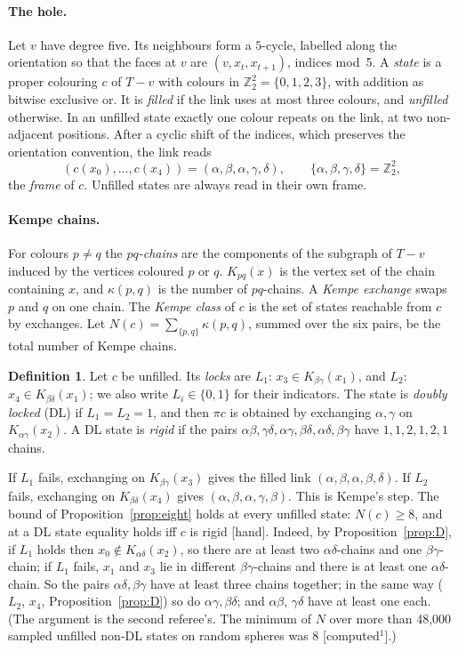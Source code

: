 \documentclass[11pt]{article}
\theoremstyle{definition}
\newtheorem{definition}[theorem]{Definition}
\newcommand{\lab}[1]{\textsf{[#1]}}
\newcommand{\labone}{\textsf{[computed$^1$]}}
\newcommand{\Z}{\mathbb Z}
\begin{document}
\paragraph{The hole.} Let $v$ have degree five. Its neighbours form a $5$-cycle, labelled along the orientation so that the faces at $v$ are $(v,x_t,x_{t+1})$, indices mod~5. A \emph{state} is a proper colouring $c$ of $T-v$ with colours in $\Z_2^2=\{0,1,2,3\}$, with addition as bitwise exclusive or. It is \emph{filled} if the link uses at most three colours, and \emph{unfilled} otherwise. In an unfilled state exactly one colour repeats on the link, at two non-adjacent positions. After a cyclic shift of the indices, which preserves the orientation convention, the link reads
\[(c(x_0),\dots,c(x_4))=(\alpha,\beta,\alpha,\gamma,\delta),\qquad\{\alpha,\beta,\gamma,\delta\}=\Z_2^2,\]
the \emph{frame} of $c$. Unfilled states are always read in their own frame.

\paragraph{Kempe chains.} For colours $p\ne q$ the \emph{$pq$-chains} are the components of the subgraph of $T-v$ induced by the vertices coloured $p$ or $q$. $K_{pq}(x)$ is the vertex set of the chain containing $x$, and $\kappa(p,q)$ is the number of $pq$-chains. A \emph{Kempe exchange} swaps $p$ and $q$ on one chain. The \emph{Kempe class} of $c$ is the set of states reachable from $c$ by exchanges. Let $N(c)=\sum_{\{p,q\}}\kappa(p,q)$, summed over the six pairs, be the total number of Kempe chains.

\begin{definition}\label{def:locks}
Let $c$ be unfilled. Its \emph{locks} are $L_1$: $x_3\in K_{\beta\gamma}(x_1)$, and $L_2$: $x_4\in K_{\beta\delta}(x_1)$; we also write $L_i\in\{0,1\}$ for their indicators. The state is \emph{doubly locked} (DL) if $L_1=L_2=1$, and then $\pi c$ is obtained by exchanging $\alpha,\gamma$ on $K_{\alpha\gamma}(x_2)$. A DL state is \emph{rigid} if the pairs $\alpha\beta,\gamma\delta,\alpha\gamma,\beta\delta,\alpha\delta,\beta\gamma$ have $1,1,2,1,2,1$ chains.
\end{definition}
If $L_1$ fails, exchanging on $K_{\beta\gamma}(x_3)$ gives the filled link $(\alpha,\beta,\alpha,\beta,\delta)$. If $L_2$ fails, exchanging on $K_{\beta\delta}(x_4)$ gives $(\alpha,\beta,\alpha,\gamma,\beta)$. This is Kempe's step. The bound of Proposition~\ref{prop:eight} holds at every unfilled state: $N(c)\ge 8$, and at a DL state equality holds iff $c$ is rigid \lab{hand}. Indeed, by Proposition~\ref{prop:D}, if $L_1$ holds then $x_0\notin K_{\alpha\delta}(x_2)$, so there are at least two $\alpha\delta$-chains and one $\beta\gamma$-chain; if $L_1$ fails, $x_1$ and $x_3$ lie in different $\beta\gamma$-chains and there is at least one $\alpha\delta$-chain. So the pairs $\alpha\delta,\beta\gamma$ have at least three chains together; in the same way ($L_2$, $x_4$, Proposition~\ref{prop:D}) so do $\alpha\gamma,\beta\delta$; and $\alpha\beta$, $\gamma\delta$ have at least one each. (The argument is the second referee's. The minimum of $N$ over more than 48,000 sampled unfilled non-DL states on random spheres was 8 \labone.)
\end{document}
